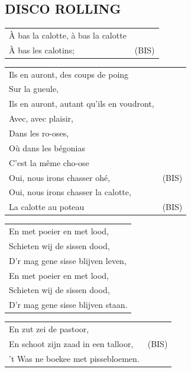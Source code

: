 \documentclass[a4paper, 14pt]{extarticle}
\begin{document}
\subsection*{DISCO ROLLING}
\begin{flushleft}
\begin{tabularx}{0.8\textwidth} {
   >{\raggedright\arraybackslash}X | c}
   À bas la calotte, à bas la calotte & \\
À bas les calotins; & (BIS)\\\end{tabularx}
\begin{tabularx}{0.8\textwidth} {
   >{\raggedright\arraybackslash}X c}
Ils en auront, des coups de poing\\
Sur la gueule,\\
Ils en auront, autant qu’ils en voudront,\\
Avec, avec plaisir,\\
Dans les ro-oses,\\
Où dans les bégonias\\
C’est la même cho-ose\\
Oui, nous irons chasser ohé, & (BIS)\\
Oui, nous irons chasser la calotte,\\
La calotte au poteau & (BIS)\\
\end{tabularx}
\end{flushleft}\begin{flushleft}
\begin{tabularx}{0.8\textwidth} {
   >{\raggedright\arraybackslash}X}
En met poeier en met lood,\\
Schieten wij de sissen dood,\\
D’r mag gene sisse blijven leven,\\
En met poeier en met lood,\\
Schieten wij de sissen dood,\\
D’r mag gene sisse blijven staan.\\
\end{tabularx}
\begin{tabularx}{0.8\textwidth} {
   >{\raggedright\arraybackslash}X | c}
En zut zei de pastoor, & \\
En schoot zijn zaad in een talloor, & (BIS)\\
’t Was ne boekee met pissebloemen. & \\
\end{tabularx}
\end{flushleft}\begin{flushleft}

\end{flushleft}
\end{document}

